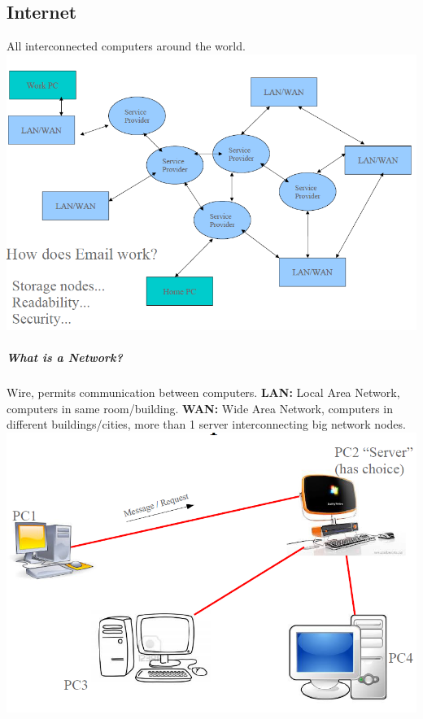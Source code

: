 \documentclass[12 pt]{article}
\begin{document}
	\subsection{Internet} All interconnected computers around the world. \includegraphics[scale=0.5]{inter}
	\subparagraph{What is a Network?}
	Wire, permits communication between computers. \textbf{LAN:} Local Area Network, computers in same room/building. \textbf{WAN:} Wide Area Network, computers in different buildings/cities, more than 1 server interconnecting big network nodes.
	\includegraphics[scale=0.4]{ntw}
\end{document}
